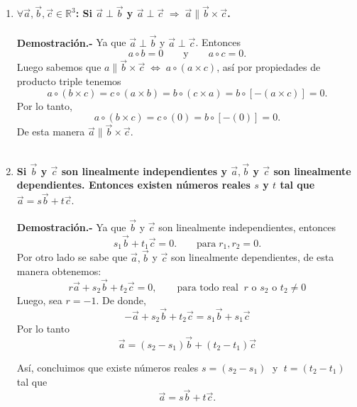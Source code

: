 
\begin{enumerate}

    \item \textbf{\boldmath $\forall \vec{a},\vec{b},\vec{c} \in \mathbb{R}^3$: Si $\vec{a} \perp \vec{b}$ y $\vec{a}\perp \vec{c}\; \Rightarrow \; \vec{a} \parallel \vec{b}\times \vec{c}$.\\\\
	Demostración.-}\; Ya que $\vec{a}\perp \vec{b}$ y $\vec{a}\perp\vec{c}$. Entonces 
	$$a\circ b=0\qquad \mbox{y}\qquad a\circ c = 0.$$
	Luego sabemos que $a\parallel \vec{b}\times \vec{c} \;\Leftrightarrow\; a\circ(a\times c)$, así por propiedades de producto triple tenemos
	$$a\circ (b\times c) = c\circ (a\times b)=b\circ (c\times a) = b\circ \left[-(a\times c)\right]=0.$$
	Por lo tanto,
	$$a\circ (b\times c) = c\circ (0) = b\circ \left[-(0)\right]=0.$$
	De esta manera $\vec{a}\parallel \vec{b}\times \vec{c}.$\\\\

    \item \textbf{\boldmath Si $\vec{b}$ y $\vec{c}$ son linealmente independientes y $\vec{a},\vec{b}$ y $\vec{c}$ son linealmente dependientes. Entonces existen números reales $s$ y $t$ tal que $\vec{a}=s\vec{b}+t\vec{c}.$\\\\
	Demostración.-}\; Ya que $\vec{b}$ y $\vec{c}$ son linealmente independientes, entonces 
	$$s_1\vec{b}+t_1\vec{c}=0. \qquad \mbox{para}\; r_1,r_2=0.$$
	Por otro lado se sabe que $\vec{a},\vec{b}$ y $\vec{c}$ son linealmente dependientes, de esta manera obtenemos: 
	$$r\vec{a}+s_2\vec{b}+t_2\vec{c}=0,\qquad \mbox{para todo real}\;\; r \mbox{ o } s_2 \mbox{ o } t_2\neq 0$$
	Luego, sea $r=-1$. De donde, 
	$$-\vec{a}+s_2\vec{b}+t_2\vec{c}=s_1\vec{b}+s_1\vec{c}$$
	Por lo tanto 
	$$\vec{a}=(s_2-s_1)\vec{b}+(t_2-t_1)\vec{c}$$

	Así, concluimos que existe números reales $s=(s_2-s_1)\;$ y $\;t=(t_2-t_1)$ tal que 
	$$\vec{a}=s\vec{b}+t\vec{c}.$$\\

\end{enumerate}
